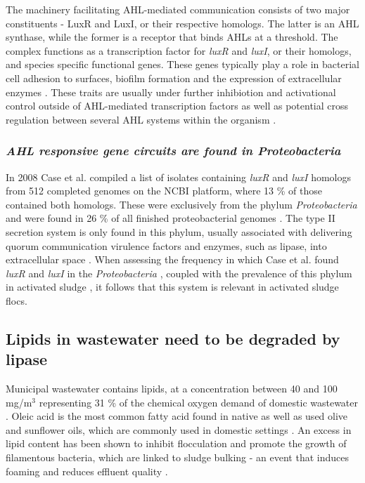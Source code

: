 \documentclass{article}
\begin{document}
The machinery facilitating AHL-mediated communication consists of two major constituents - LuxR and LuxI, or their respective homologs. The latter is an AHL synthase, while the former is a receptor that binds AHLs at a threshold. The complex functions as a transcription factor for \textit{luxR} and \textit{luxI}, or their homologs, and species specific functional genes. These genes typically play a role in bacterial cell adhesion to surfaces, biofilm formation and the expression of extracellular enzymes \cite{Flemming_10}.
These traits are usually under further inhibiotion and activational control outside of AHL-mediated transcription factors as well as potential cross regulation between several AHL systems within the organism \cite{juhas2005}.


\subsubsection{\emph{AHL responsive gene circuits are found in Proteobacteria}}
In 2008 Case et al. compiled a list of isolates containing \emph{luxR} and \emph{luxI} homologs from 512 completed genomes on the NCBI platform, where 13 \% of those contained both homologs. These were exclusively from the phylum \emph{Proteobacteria} and were found in 26 \% of all finished proteobacterial genomes \cite{case_08}.
The type II secretion system is only found in this phylum, usually associated with delivering quorum communication virulence factors and enzymes, such as lipase, into extracellular space \cite{sandkvist2001}. 
When assessing the frequency in which Case et al. found \emph{luxR} and \emph{luxI} in the \emph{Proteobacteria} \cite{case_08}, coupled with the prevalence of this phylum in activated sludge \cite{Wagner_02,Hesham_11}, it follows that this system is relevant in activated sludge flocs. 

\subsection{Lipids in wastewater need to be degraded by lipase}
Municipal wastewater contains lipids, at a concentration between 40 and 100 mg/m$^{3}$ \cite{Forster_92} representing 31 \% of the chemical oxygen demand of domestic wastewater \cite{Raunkjaer_94}. Oleic acid is the most common fatty acid found in native as well as used olive and sunflower oils, which are commonly used in domestic settings \cite{haba2000isolation}.  An excess in lipid content has been shown to inhibit flocculation and promote the growth of filamentous bacteria, which are linked to sludge bulking - an event that induces foaming and reduces effluent quality \cite{Forster_92}.
\end{document}
